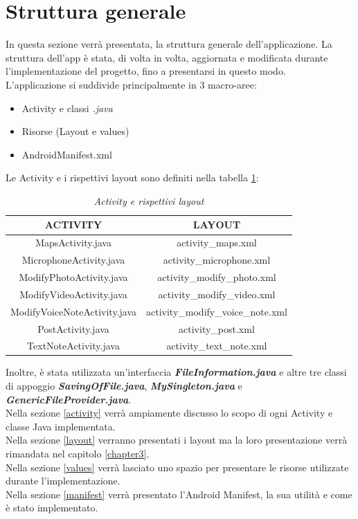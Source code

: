 \section{Struttura generale}

In questa sezione verrà presentata, la struttura generale dell'applicazione. La struttura dell'app è stata, di volta in volta, aggiornata e modificata durante l'implementazione del progetto, fino a presentarsi in questo modo.
\\L'applicazione si suddivide principalmente in 3 macro-aree:
\begin{itemize}
    \item Activity e classi \textit{.java}
    \item Risorse (Layout e values)
    \item AndroidManifest.xml
\end{itemize}
Le Activity e i rispettivi layout sono definiti nella tabella \ref{tabella}:

\begin{table}[h!]
\centering
    \begin{tabular}{||c c||} 
         \hline
         \textbf{ACTIVITY} & \textbf{LAYOUT} \\ [0.5ex] 
         \hline\hline
         MapsActivity.java & activity\_maps.xml \\ 
         MicrophoneActivity.java & activity\_microphone.xml  \\
         ModifyPhotoActivity.java & activity\_modify\_photo.xml \\
         ModifyVideoActivity.java & activity\_modify\_video.xml  \\
         ModifyVoiceNoteActivity.java & activity\_modify\_voice\_note.xml  \\ 
         PostActivity.java & activity\_post.xml \\
         TextNoteActivity.java & activity\_text\_note.xml \\ [1ex] 
         \hline
    \end{tabular}
    \caption {\textit{Activity e rispettivi layout}}
    \label{tabella}
\end{table}
\noindent
Inoltre, è stata utilizzata un'interfaccia \textit{\textbf{FileInformation.java}} e altre tre classi di appoggio \textit{\textbf{SavingOfFile.java}},  \textit{\textbf{MySingleton.java}} e \textit{\textbf{GenericFileProvider.java}}.
\\Nella sezione \ref{activity} verrà ampiamente discusso lo scopo di ogni Activity e classe Java implementata.
\\Nella sezione \ref{layout} verranno presentati i layout ma la loro presentazione verrà rimandata nel capitolo \ref{chapter3}.
\\Nella sezione \ref{values} verrà lasciato uno spazio per presentare le risorse utilizzate durante l'implementazione.
\\Nella sezione \ref{manifest} verrà presentato l'Android Manifest, la sua utilità e come è stato implementato.

